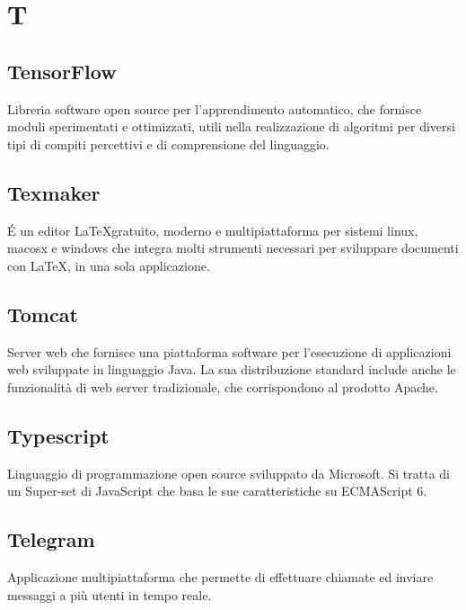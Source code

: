 \section*{T}
\markright{}
\subsection*{TensorFlow}
Libreria software open source per l'apprendimento automatico, che fornisce moduli sperimentati e ottimizzati, utili nella realizzazione di algoritmi per diversi tipi di compiti percettivi e di comprensione del linguaggio.
\subsection*{Texmaker}
\'E un editor \LaTeX gratuito, moderno e multipiattaforma per sistemi linux, macosx e windows che integra molti strumenti necessari per sviluppare documenti con \LaTeX, in una sola applicazione.
\subsection*{Tomcat}
Server web che fornisce una piattaforma software per l'esecuzione di applicazioni web sviluppate in linguaggio Java. La sua distribuzione standard include anche le funzionalità di web server tradizionale, che corrispondono al prodotto Apache. 
\subsection*{Typescript}
Linguaggio di programmazione open source sviluppato da Microsoft. Si tratta di un Super-set di JavaScript che basa le sue caratteristiche su ECMAScript 6.

\subsection*{Telegram}
Applicazione multipiattaforma che permette di effettuare chiamate ed inviare messaggi a più utenti in tempo reale.
